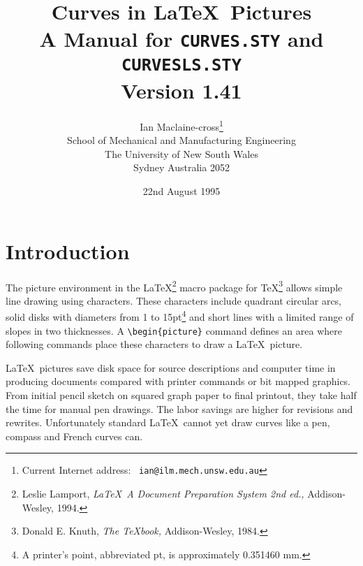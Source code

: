   \newcommand{\version}{1.41} 
  \pagestyle{headings}
  
  \title{Curves in \LaTeX\ Pictures\\
  A Manual for {\tt CURVES.STY} and {\tt CURVESLS.STY}\\Version \version}
  \author{Ian Maclaine-cross\thanks{Current Internet address: {\tt
ian@ilm.mech.unsw.edu.au}}\\
 \small  School of Mechanical and Manufacturing Engineering\\ 
  \small  The University of New South Wales\\ 
  \small Sydney Australia 2052} 
  \date{22nd August 1995} 
  \maketitle
  \thispagestyle{empty}
  \tableofcontents
  \section{Introduction}
 
 The picture environment in the \LaTeX \footnote{Leslie Lamport, {\sl
\LaTeX\ A Document Preparation System 2nd ed.,} Addison-Wesley, 1994.} macro
package for \TeX \footnote{Donald E. Knuth, {\sl The \TeX book,}
Addison-Wesley, 1984.}  allows simple line drawing using
characters. These characters include quadrant circular arcs, solid
disks with diameters from 1 to 15pt\footnote{A printer's point,
abbreviated pt, is approximately 0.351460 mm.}  and short lines with a
limited range of slopes in two thicknesses.  A \verb?\begin{picture}?
command defines an area where following commands place these
characters to draw a \LaTeX\ picture. 

  \LaTeX\ pictures save disk space for source descriptions and
computer time in producing documents compared with printer commands or
bit mapped graphics.  From initial pencil sketch on squared graph
paper to final printout, they take half the time for manual pen
drawings. The labor savings are higher for revisions and
rewrites. Unfortunately standard \LaTeX\ cannot yet draw curves like a
pen, compass and French curves can.


